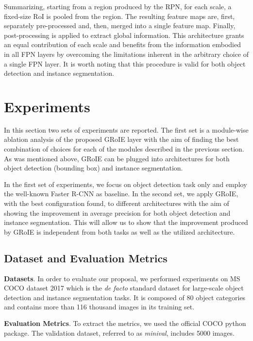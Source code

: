 \documentclass[10pt,conference,a4paper]{IEEEtran}
\begin{document}
Summarizing, starting from a region produced by the RPN, for each scale, a fixed-size RoI is pooled from the region. The resulting  feature maps are, first, separately pre-processed and, then, merged into a single feature map. Finally, post-processing is applied to extract global information. This architecture grants an equal contribution of each scale and benefits from the information embodied in all FPN layers by overcoming the limitations inherent in the arbitrary choice of a single FPN layer. It is worth noting that this procedure is valid for both object detection and instance segmentation.
 \section{Experiments}
\label{sec:experiments}

In this section two sets of experiments are reported.
The first set is a module-wise ablation analysis of the proposed GRoIE layer with the aim of finding the best combination of choices for each of the modules described in the previous section.
As was mentioned above, GRoIE can be plugged into architectures for both object detection (bounding box) and instance segmentation.

In the first set of experiments, we focus on object detection task only and employ the well-known Faster R-CNN as baseline.
In the second set, we apply GRoIE, with the best configuration found, to different architectures with the aim of showing the improvement in average precision for both object detection and instance segmentation.
This will allow us to show that the improvement produced by GRoIE is independent from both tasks as well as the utilized architecture.

\subsection{Dataset and Evaluation Metrics}
\label{subsec:dataset}

\noindent\textbf{Datasets}.
In order to evaluate our proposal, we performed experiments on MS COCO dataset 2017 \cite{lin2014microsoft} which is the \emph{de facto} standard dataset for large-scale object detection and instance segmentation tasks.
It is composed of 80 object categories and contains more than 116 thousand images in its training set.

\noindent\textbf{Evaluation Metrics}.
To extract the metrics, we used the official COCO python package.
The validation dataset, referred to as \emph{minival}, includes 5000 images.
\end{document}
